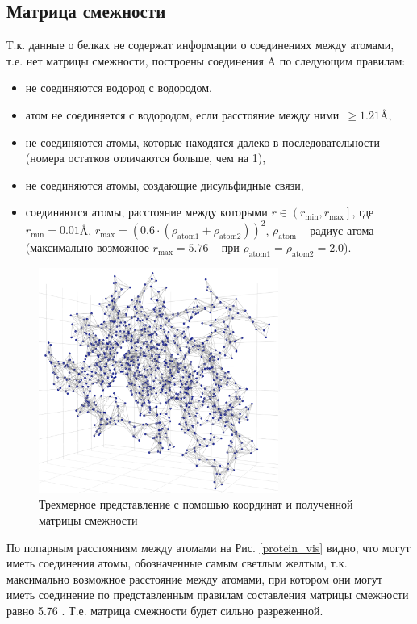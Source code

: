 \documentclass[14pt]{extarticle}
\begin{document}
\subsection{Матрица смежности}
Т.к. данные о белках не содержат информации о соединениях между атомами, т.е. нет матрицы смежности, построены соединения A по следующим правилам:
\begin{itemize}
	\item не соединяются водород с водородом,
	\item атом не соединяется с водородом, если расстояние между ними~$\geq 1.21$\AA,
	\item не соединяются атомы, которые находятся далеко в последовательности (номера остатков отличаются больше, чем на 1),
	\item не соединяются атомы, создающие дисульфидные связи,
	\item соединяются атомы, расстояние между которыми $r\in \left(r_\text{min}, r_\text{max}\right]$, где $r_\text{min} = 0.01$\AA, $r_\text{max} = \left(0.6\cdot(\rho_\text{atom1}+\rho_\text{atom2})\right)^2$, $\rho_\text{atom}$ -- радиус атома (максимально возможное $r_\text{max} = 5.76$ -- при $\rho_\text{atom1} = \rho_\text{atom2} = 2.0$).
\end{itemize}


\begin{figure}[H]
		\centering
		\includegraphics[width=0.7\textwidth]{3d_graph.pdf}
			\caption{Трехмерное представление с помощью координат и полученной матрицы смежности}
			\label{fig:3Dgraph}
\end{figure}
По попарным расстояниям между атомами на Рис. \ref{protein_vis} видно, что могут иметь соединения атомы, обозначенные самым светлым желтым, т.к. максимально возможное расстояние между атомами, при котором они могут иметь соединение по представленным правилам составления матрицы смежности равно 5.76 . Т.е. матрица смежности будет сильно разреженной.
\end{document}
